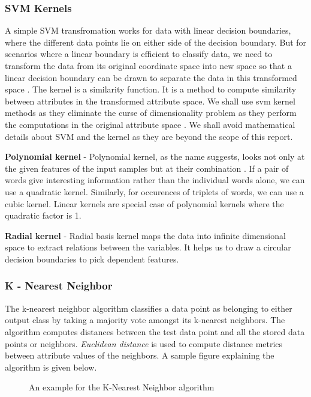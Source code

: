 \documentclass[9pt,twocolumn,twoside]{../../styles/osajnl}
\begin{document}
\subsubsection{SVM Kernels}
A simple SVM transfromation works for data with linear decision
boundaries, where the different data points lie on either side of the
decision boundary. But for scenarios where a linear boundary is
efficient to classify data, we need to transform the data from its
original coordinate space into new space so that a linear decision
boundary can be drawn to separate the data in this transformed space
\cite{book-dataminingintroduction}. The kernel is a similarity
function. It is a method to compute similarity between attributes in
the transformed attribute space. We shall use svm kernel methods as
they eliminate the curse of dimensionality problem as they perform the
computations in the original attribute space
\cite{book-dataminingintroduction}. We shall avoid mathematical
details about SVM and the kernel as they are beyond the scope of this
report.

\textbf{Polynomial kernel} - Polynomial kernel, as the name suggests, looks not
only at the given features of the input samples but at their
combination \cite{www-polykernel-wiki}. If a pair of words give
interesting information rather than the individual words alone, we can
use a quadratic kernel. Similarly, for occurences of triplets of
words, we can use a cubic kernel. Linear kernels are special case of
polynomial kernels where the quadratic factor is 1.


\textbf{Radial kernel} - Radial basis kernel maps the data into infinite
dimensional space to extract relations between the variables. It helps
us to draw a circular decision boundaries to pick dependent features.

\subsubsection{K - Nearest Neighbor}
The k-nearest neighbor algorithm classifies a data point as belonging
to either output class by taking a majority vote amongst its k-nearest
neighbors. The algorithm computes distances between the test data
point and all the stored data points or neighbors. \emph{Euclidean
  distance} \cite{www-wiki-euclidean_distance} is used to compute
distance metrics between attribute values of the neighbors. A sample
figure explaining the algorithm is given below.

\begin{figure}[htbp]
\centering
{}
\caption{An example for the K-Nearest Neighbor algorithm \cite{www-knn-introduction}}
\label{fig: An example for the K-Nearest Neighbor algorithm}
\end{figure}
\end{document}
